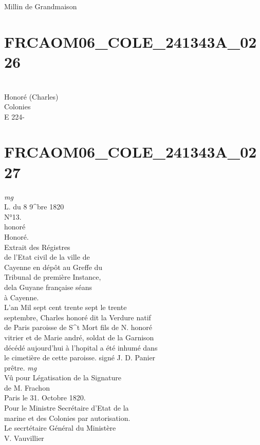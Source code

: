 \documentclass{article}
\begin{document}
\begin{pages}
Millin de Grandmaison
\pend
\endnumbering\beginnumbering\section{FRCAOM06\_COLE\_241343A\_0226}\pstart
\\
Honoré (Charles)\\
Colonies\\
E 224-
\pend
\endnumbering\beginnumbering\section{FRCAOM06\_COLE\_241343A\_0227}
\vspace{0.5cm}\noindent
\textit{mg}
\footnotesize \\
L. du 8 9\^{}bre 1820\\
N°13.\\
honoré
\normalsize \pstart
\\
Honoré.\\
Extrait des Régistres\\
de l'Etat civil de la ville de\\
Cayenne en dépôt au Greffe du\\
Tribunal de première Instance,\\
dela Guyane française séans\\
à Cayenne.\\
L'an Mil sept cent trente sept le trente\\
septembre, Charles honoré dit la Verdure natif\\
de Paris paroisse de S\^{}t Mort fils de N. honoré\\
vitrier et de Marie andré, soldat de la Garnison\\
décédé aujourd'hui à l'hopital a été inhumé dans\\
le cimetière de cette paroisse. signé J. D. Panier\\
prêtre.
\pend
\vspace{0.5cm}\noindent
\textit{mg}
\footnotesize \\
Vû pour Légatisation de la Signature\\
de M. Frachon\\
Paris le 31. Octobre 1820.\\
Pour le Ministre Secrétaire d'Etat de la\\
marine et des Colonies par autorisation.\\
Le secrtétaire Général du Ministère\\
V. Vauvillier
\normalsize \pstart
\\

\end{pages}
\end{document}

